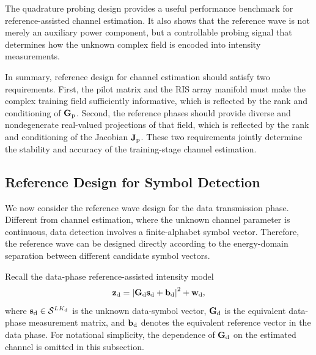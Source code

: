 \documentclass[journal]{IEEEtran}
\begin{document}
The quadrature probing design provides a useful performance benchmark for reference-assisted channel estimation. 
It also shows that the reference wave is not merely an auxiliary power component, but a controllable probing signal that determines how the unknown complex field is encoded into intensity measurements.

In summary, reference design for channel estimation should satisfy two requirements. 
First, the pilot matrix and the RIS array manifold must make the complex training field sufficiently informative, which is reflected by the rank and conditioning of $\mathbf{G}_{\rm p}$. 
Second, the reference phases should provide diverse and nondegenerate real-valued projections of that field, which is reflected by the rank and conditioning of the Jacobian $\mathbf{J}_{\rm p}$. 
These two requirements jointly determine the stability and accuracy of the training-stage channel estimation.

\subsection{Reference Design for Symbol Detection}

We now consider the reference wave design for the data transmission phase. 
Different from channel estimation, where the unknown channel parameter is continuous, data detection involves a finite-alphabet symbol vector. 
Therefore, the reference wave can be designed directly according to the energy-domain separation between different candidate symbol vectors.

Recall the data-phase reference-assisted intensity model
\begin{equation}
\mathbf{z}_{\rm d}
=
\left|
\mathbf{G}_{\rm d}\mathbf{s}_{\rm d}
+
\mathbf{b}_{\rm d}
\right|^2
+
\mathbf{w}_{\rm d},
\label{eq:data_model_reference_design}
\end{equation}
where $\mathbf{s}_{\rm d}\in\mathcal{S}^{LK_{\rm d}}$ is the unknown data-symbol vector, $\mathbf{G}_{\rm d}$ is the equivalent data-phase measurement matrix, and $\mathbf{b}_{\rm d}$ denotes the equivalent reference vector in the data phase. 
For notational simplicity, the dependence of $\mathbf{G}_{\rm d}$ on the estimated channel is omitted in this subsection.
\end{document}

